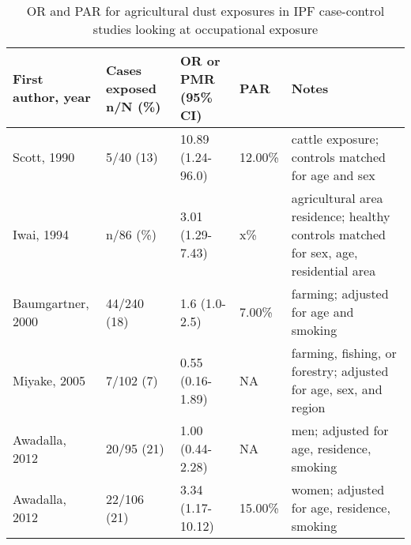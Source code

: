 \documentclass[a4
er,12pt]{article}
\begin{document}
\begin{table}   
     \begin{tabular}{p{3.5cm}p{3cm}p{2cm}p{2cm}p{3.5cm}}
     \textbf{First author, year} & \textbf{Cases exposed n/N (\%)} & \textbf{OR or PMR (95\% CI)} & \textbf{PAR} &   \textbf{Notes} \\
     \midrule
  Scott, 1990 &  5/40 (13) &  10.89 (1.24-96.0) &  12.00\% &  cattle exposure; controls matched for age and sex \\
 Iwai, 1994 &  n/86 (\%) &  3.01 (1.29-7.43) &  x\% &  agricultural area residence; healthy controls matched for sex, age, residential area \\
 Baumgartner, 2000 &  44/240 (18) &  1.6 (1.0-2.5) &  7.00\% &  farming; adjusted for age and smoking \\
 Miyake, 2005 &  7/102 (7) &  0.55 (0.16-1.89) &  NA &  farming, fishing, or forestry; adjusted for age, sex, and region \\
 Awadalla, 2012 &  20/95 (21) &  1.00 (0.44-2.28) &  NA &  men; adjusted for age, residence, smoking \\
 Awadalla, 2012 &  22/106 (21) &  3.34 (1.17-10.12) &  15.00\% &  women; adjusted for age, residence, smoking \\
     \bottomrule
     \end{tabular}                 
     \caption{OR and PAR for agricultural dust exposures in IPF case-control studies looking at occupational exposure}
     \label{table:ipfagridust}
 \end{table}                                                                                                                                                                                        






\clearpage

\makeatletter
 \def\@biblabel#1{#1}
\makeatother



\end{document}
